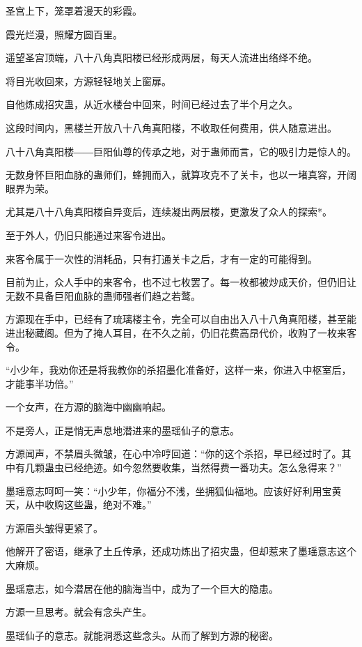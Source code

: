 
\begin{this_body}

圣宫上下，笼罩着漫天的彩霞。

霞光烂漫，照耀方圆百里。

遥望圣宫顶端，八十八角真阳楼已经形成两层，每天人流进出络绎不绝。

将目光收回来，方源轻轻地关上窗扉。

自他炼成招灾蛊，从近水楼台中回来，时间已经过去了半个月之久。

这段时间内，黑楼兰开放八十八角真阳楼，不收取任何费用，供人随意进出。

八十八角真阳楼――巨阳仙尊的传承之地，对于蛊师而言，它的吸引力是惊人的。

无数身怀巨阳血脉的蛊师们，蜂拥而入，就算攻克不了关卡，也以一堵真容，开阔眼界为荣。

尤其是八十八角真阳楼自异变后，连续凝出两层楼，更激发了众人的探索*。

至于外人，仍旧只能通过来客令进出。

来客令属于一次性的消耗品，只有打通关卡之后，才有一定的可能得到。

目前为止，众人手中的来客令，也不过七枚罢了。每一枚都被炒成天价，但仍旧让无数不具备巨阳血脉的蛊师强者们趋之若鹜。

方源现在手中，已经有了琉璃楼主令，完全可以自由出入八十八角真阳楼，甚至能进出秘藏阁。但为了掩人耳目，在不久之前，仍旧花费高昂代价，收购了一枚来客令。

“小少年，我劝你还是将我教你的杀招墨化准备好，这样一来，你进入中枢室后，才能事半功倍。”

一个女声，在方源的脑海中幽幽响起。

不是旁人，正是悄无声息地潜进来的墨瑶仙子的意志。

方源闻声，不禁眉头微皱，在心中冷哼回道：“你的这个杀招，早已经过时了。其中有几颗蛊虫已经绝迹。如今忽然要收集，当然得费一番功夫。怎么急得来？”

墨瑶意志呵呵一笑：“小少年，你福分不浅，坐拥狐仙福地。应该好好利用宝黄天，从中收购这些蛊，绝对不难。”

方源眉头皱得更紧了。

他解开了密语，继承了土丘传承，还成功炼出了招灾蛊，但却惹来了墨瑶意志这个大麻烦。

墨瑶意志，如今潜居在他的脑海当中，成为了一个巨大的隐患。

方源一旦思考。就会有念头产生。

墨瑶仙子的意志。就能洞悉这些念头。从而了解到方源的秘密。


\end{this_body}
